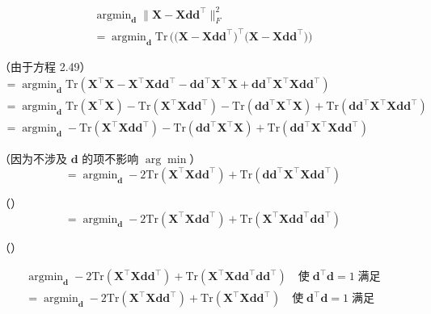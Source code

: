 \begin{gather}
  \mathop{\arg\min}_{\pmb{d}}\|\pmb{X} - \pmb{X}\pmb{d}\pmb{d}^{\top}\|^2_F\\ =
  \mathop{\arg\min}_{\pmb{d}}\mathrm{Tr}\,\bigg(\Big(\pmb{X} -
  \pmb{X}\pmb{d}\pmb{d}^{\top}\Big)^{\top}\Big(\pmb{X} -
  \pmb{X}\pmb{d}\pmb{d}^{\top}\Big)\bigg)
\end{gather}

（由于方程 2.49）
\begin{gather}
  = \mathop{\arg\min}_{\pmb{d}}\mathrm{Tr}(\pmb{X}^{\top}\pmb{X} -
  \pmb{X}^{\top}\pmb{X}\pmb{d}\pmb{d}^{\top} -
  \pmb{d}\pmb{d}^{\top}\pmb{X}^{\top}\pmb{X} +
  \pmb{d}\pmb{d}^{\top}\pmb{X}^{\top}\pmb{X}\pmb{d}\pmb{d}^{\top})\\ =
  \mathop{\arg\min}_{\pmb{d}}\mathrm{Tr}(\pmb{X}^{\top}\pmb{X}) -
  \mathrm{Tr}(\pmb{X}^{\top}\pmb{X}\pmb{d}\pmb{d}^{\top}) -
  \mathrm{Tr}(\pmb{d}\pmb{d}^{\top}\pmb{X}^{\top}\pmb{X}) +
  \mathrm{Tr}(\pmb{d}\pmb{d}^{\top}\pmb{X}^{\top}\pmb{X}\pmb{d}\pmb{d}^{\top})\\ =
  \mathop{\arg\min}_{\pmb{d}} -
  \mathrm{Tr}(\pmb{X}^{\top}\pmb{X}\pmb{d}\pmb{d}^{\top}) -
  \mathrm{Tr}(\pmb{d}\pmb{d}^{\top}\pmb{X}^{\top}\pmb{X}) +
  \mathrm{Tr}(\pmb{d}\pmb{d}^{\top}\pmb{X}^{\top}\pmb{X}\pmb{d}\pmb{d}^{\top})
\end{gather}

（因为不涉及 $\pmb{d}$ 的项不影响 $\arg\min$）
\begin{equation}
  = \mathop{\arg\min}_{\pmb{d}} -
  2\mathrm{Tr}(\pmb{X}^{\top}\pmb{X}\pmb{d}\pmb{d}^{\top}) +
  \mathrm{Tr}(\pmb{d}\pmb{d}^{\top}\pmb{X}^{\top}\pmb{X}\pmb{d}\pmb{d}^{\top})
\end{equation}

（）
\begin{equation}
  = \mathop{\arg\min}_{\pmb{d}} -
  2\mathrm{Tr}(\pmb{X}^{\top}\pmb{X}\pmb{d}\pmb{d}^{\top}) +
  \mathrm{Tr}(\pmb{X}^{\top}\pmb{X}\pmb{d}\pmb{d}^{\top}\pmb{d}\pmb{d}^{\top})
\end{equation}

（）

\begin{gather}
  \mathop{\arg\min}_{\pmb{d}} -
  2\mathrm{Tr}(\pmb{X}^{\top}\pmb{X}\pmb{d}\pmb{d}^{\top}) +
  \mathrm{Tr}(\pmb{X}^{\top}\pmb{X}\pmb{d}\pmb{d}^{\top}\pmb{d}\pmb{d}^{\top})
  \quad\text{使}\;\pmb{d}^{\top}\pmb{d} = 1\;\text{满足}\\
  = \mathop{\arg\min}_{\pmb{d}} -
  2\mathrm{Tr}(\pmb{X}^{\top}\pmb{X}\pmb{d}\pmb{d}^{\top}) +
  \mathrm{Tr}(\pmb{X}^{\top}\pmb{X}\pmb{d}\pmb{d}^{\top})
  \quad\text{使}\;\pmb{d}^{\top}\pmb{d} = 1\;\text{满足}
\end{gather}

